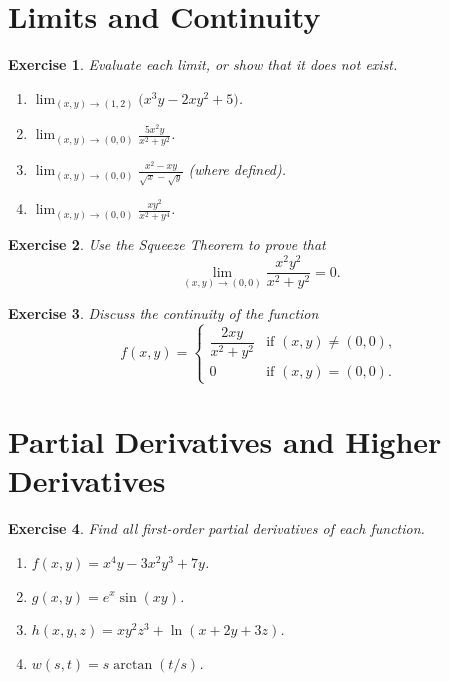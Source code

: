 \documentclass[12pt,a4paper]{article}
\theoremstyle{exercise}
\newtheorem{exercise}{Exercise}[section]
\theoremstyle{hint}
\begin{document}
\section{Limits and Continuity}

\begin{exercise}
Evaluate each limit, or show that it does not exist.
\begin{enumerate}[label=(\alph*)]
  \item $\displaystyle\lim_{(x,y)\to(1,2)}\bigl(x^{3}y-2xy^{2}+5\bigr)$.
  \item $\displaystyle\lim_{(x,y)\to(0,0)}\frac{5x^{2}y}{x^{2}+y^{2}}$.
  \item $\displaystyle\lim_{(x,y)\to(0,0)}\frac{x^{2}-xy}{\sqrt{x}-\sqrt{y}}$
        (where defined).
  \item $\displaystyle\lim_{(x,y)\to(0,0)}\frac{xy^{2}}{x^{2}+y^{4}}$.
\end{enumerate}
\end{exercise}

\begin{exercise}
Use the Squeeze Theorem to prove that
\[
  \lim_{(x,y)\to(0,0)}\frac{x^{2}y^{2}}{x^{2}+y^{2}}=0.
\]
\end{exercise}

\begin{exercise}
Discuss the continuity of the function
\[
  f(x,y)=
  \begin{cases}
    \dfrac{2xy}{x^{2}+y^{2}} & \text{if }(x,y)\neq(0,0),\\[6pt]
    0 & \text{if }(x,y)=(0,0).
  \end{cases}
\]
\end{exercise}

\section{Partial Derivatives and Higher Derivatives}

\begin{exercise}
Find all first-order partial derivatives of each function.
\begin{enumerate}[label=(\alph*)]
  \item $f(x,y)=x^{4}y-3x^{2}y^{3}+7y$.
  \item $g(x,y)=e^{x}\sin(xy)$.
  \item $h(x,y,z)=xy^{2}z^{3}+\ln(x+2y+3z)$.
  \item $w(s,t)=s\arctan(t/s)$.
\end{enumerate}
\end{exercise}
\end{document}
